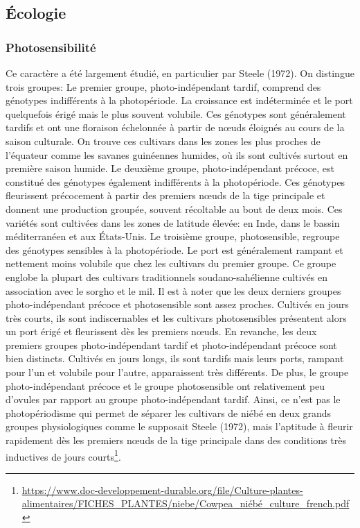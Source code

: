 \documentclass[a4paper,11pt]{article}
\begin{document}
\subsection{Écologie}

\subsubsection{Photosensibilité}

Ce caractère a été largement étudié, en particulier par Steele
(1972). On distingue trois groupes: Le premier groupe,
photo-indépendant tardif, comprend des génotypes indifférents à la
photopériode. La croissance est indéterminée et le port quelquefois
érigé mais le plus souvent volubile. Ces génotypes sont généralement
tardifs et ont une floraison échelonnée à partir de nœuds éloignés au
cours de la saison culturale. On trouve ces cultivars dans les zones
les plus proches de l’équateur comme les savanes guinéennes humides,
où ils sont cultivés surtout en première saison humide.  Le deuxième
groupe, photo-indépendant précoce, est constitué des génotypes
également indifférents à la photopériode. Ces génotypes fleurissent
précocement à partir des premiers nœuds de la tige principale et
donnent une production groupée, souvent récoltable au bout de deux
mois. Ces variétés sont cultivées dans les zones de latitude élevée:
en Inde, dans le bassin méditerranéen et aux États-Unis.  Le troisième
groupe, photosensible, regroupe des génotypes sensibles à la
photopériode. Le port est généralement rampant et nettement moins
volubile que chez les cultivars du premier groupe. Ce groupe englobe
la plupart des cultivars traditionnels soudano-sahélienne cultivés en
association avec le sorgho et le mil\cite{Doggett_1988}. Il est à
noter que les deux derniers groupes photo-indépendant précoce et
photosensible sont assez proches. Cultivés en jours très courts, ils
sont indiscernables et les cultivars photosensibles présentent alors
un port érigé et fleurissent dès les premiers nœuds. En revanche, les
deux premiers groupes photo-indépendant tardif et photo-indépendant
précoce sont bien distincts. Cultivés en jours longs, ils sont tardifs
mais leurs ports, rampant pour l’un et volubile pour l’autre,
apparaissent très différents. De plus, le groupe photo-indépendant
précoce et le groupe photosensible ont relativement peu d’ovules par
rapport au groupe photo-indépendant tardif. Ainsi, ce n’est pas le
photopériodisme qui permet de séparer les cultivars de niébé en deux
grands groupes physiologiques comme le supposait Steele (1972), mais
l’aptitude à fleurir rapidement dès les premiers nœuds de la tige
principale dans des conditions très inductives de jours
courts\footnote{\url{https://www.doc-developpement-durable.org/file/Culture-plantes-alimentaires/FICHES_PLANTES/niebe/Cowpea_niébé_culture_french.pdf}}.
\end{document}
